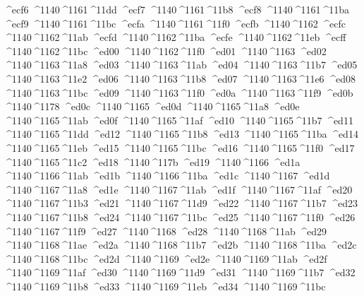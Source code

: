 \checkit ^^^^ecf6 ^^^^1140^^^^1161^^^^11dd
\checkit ^^^^ecf7 ^^^^1140^^^^1161^^^^11b8
\checkit ^^^^ecf8 ^^^^1140^^^^1161^^^^11ba
\checkit ^^^^ecf9 ^^^^1140^^^^1161^^^^11bc
\checkit ^^^^ecfa ^^^^1140^^^^1161^^^^11f0
\checkit ^^^^ecfb ^^^^1140^^^^1162
\checkit ^^^^ecfc ^^^^1140^^^^1162^^^^11ab
\checkit ^^^^ecfd ^^^^1140^^^^1162^^^^11ba
\checkit ^^^^ecfe ^^^^1140^^^^1162^^^^11eb
\checkit ^^^^ecff ^^^^1140^^^^1162^^^^11bc
\checkit ^^^^ed00 ^^^^1140^^^^1162^^^^11f0
\checkit ^^^^ed01 ^^^^1140^^^^1163
\checkit ^^^^ed02 ^^^^1140^^^^1163^^^^11a8
\checkit ^^^^ed03 ^^^^1140^^^^1163^^^^11ab
\checkit ^^^^ed04 ^^^^1140^^^^1163^^^^11b7
\checkit ^^^^ed05 ^^^^1140^^^^1163^^^^11e2
\checkit ^^^^ed06 ^^^^1140^^^^1163^^^^11b8
\checkit ^^^^ed07 ^^^^1140^^^^1163^^^^11e6
\checkit ^^^^ed08 ^^^^1140^^^^1163^^^^11bc
\checkit ^^^^ed09 ^^^^1140^^^^1163^^^^11f0
\checkit ^^^^ed0a ^^^^1140^^^^1163^^^^11f9
\checkit ^^^^ed0b ^^^^1140^^^^1178
\checkit ^^^^ed0c ^^^^1140^^^^1165
\checkit ^^^^ed0d ^^^^1140^^^^1165^^^^11a8
\checkit ^^^^ed0e ^^^^1140^^^^1165^^^^11ab
\checkit ^^^^ed0f ^^^^1140^^^^1165^^^^11af
\checkit ^^^^ed10 ^^^^1140^^^^1165^^^^11b7
\checkit ^^^^ed11 ^^^^1140^^^^1165^^^^11dd
\checkit ^^^^ed12 ^^^^1140^^^^1165^^^^11b8
\checkit ^^^^ed13 ^^^^1140^^^^1165^^^^11ba
\checkit ^^^^ed14 ^^^^1140^^^^1165^^^^11eb
\checkit ^^^^ed15 ^^^^1140^^^^1165^^^^11bc
\checkit ^^^^ed16 ^^^^1140^^^^1165^^^^11f0
\checkit ^^^^ed17 ^^^^1140^^^^1165^^^^11c2
\checkit ^^^^ed18 ^^^^1140^^^^117b
\checkit ^^^^ed19 ^^^^1140^^^^1166
\checkit ^^^^ed1a ^^^^1140^^^^1166^^^^11ab
\checkit ^^^^ed1b ^^^^1140^^^^1166^^^^11ba
\checkit ^^^^ed1c ^^^^1140^^^^1167
\checkit ^^^^ed1d ^^^^1140^^^^1167^^^^11a8
\checkit ^^^^ed1e ^^^^1140^^^^1167^^^^11ab
\checkit ^^^^ed1f ^^^^1140^^^^1167^^^^11af
\checkit ^^^^ed20 ^^^^1140^^^^1167^^^^11b3
\checkit ^^^^ed21 ^^^^1140^^^^1167^^^^11d9
\checkit ^^^^ed22 ^^^^1140^^^^1167^^^^11b7
\checkit ^^^^ed23 ^^^^1140^^^^1167^^^^11b8
\checkit ^^^^ed24 ^^^^1140^^^^1167^^^^11bc
\checkit ^^^^ed25 ^^^^1140^^^^1167^^^^11f0
\checkit ^^^^ed26 ^^^^1140^^^^1167^^^^11f9
\checkit ^^^^ed27 ^^^^1140^^^^1168
\checkit ^^^^ed28 ^^^^1140^^^^1168^^^^11ab
\checkit ^^^^ed29 ^^^^1140^^^^1168^^^^11ae
\checkit ^^^^ed2a ^^^^1140^^^^1168^^^^11b7
\checkit ^^^^ed2b ^^^^1140^^^^1168^^^^11ba
\checkit ^^^^ed2c ^^^^1140^^^^1168^^^^11bc
\checkit ^^^^ed2d ^^^^1140^^^^1169
\checkit ^^^^ed2e ^^^^1140^^^^1169^^^^11ab
\checkit ^^^^ed2f ^^^^1140^^^^1169^^^^11af
\checkit ^^^^ed30 ^^^^1140^^^^1169^^^^11d9
\checkit ^^^^ed31 ^^^^1140^^^^1169^^^^11b7
\checkit ^^^^ed32 ^^^^1140^^^^1169^^^^11b8
\checkit ^^^^ed33 ^^^^1140^^^^1169^^^^11eb
\checkit ^^^^ed34 ^^^^1140^^^^1169^^^^11bc
